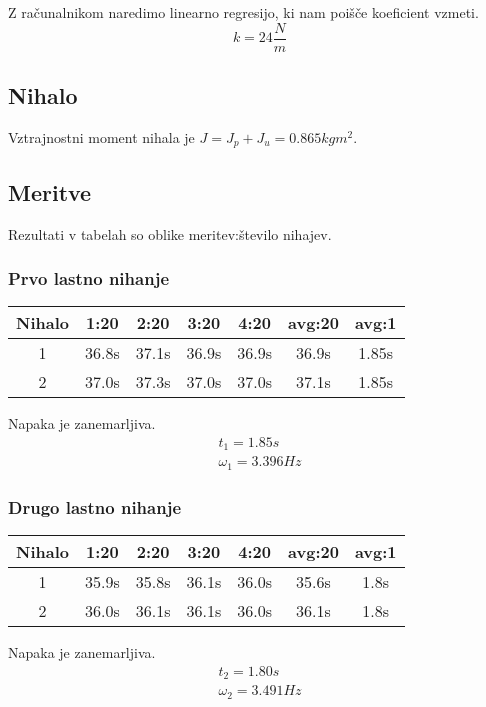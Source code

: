 \documentclass[a4paper]{article}
\begin{document}
Z računalnikom naredimo linearno regresijo, ki nam poišče koeficient vzmeti.
\[
  k=24\frac N m
\]
\subsection{Nihalo}
Vztrajnostni moment nihala je \(J = J_p+J_u = 0.865kgm^2\).
\subsection{Meritve}
Rezultati v tabelah so oblike meritev:število nihajev.
\subsubsection{Prvo lastno nihanje}
\begin{table}[htb]
  \centering
\begin{tabular}{*{7}{c}}
  Nihalo & 1:20 & 2:20 & 3:20 & 4:20 & avg:20 & avg:1\\\toprule
  1 & 36.8s & 37.1s & 36.9s & 36.9s & 36.9s & 1.85s\\\midrule
  2 & 37.0s & 37.3s & 37.0s & 37.0s & 37.1s & 1.85s\\\bottomrule
\end{tabular}
\end{table}
Napaka je zanemarljiva.
\begin{align*}
  t_1 = 1.85s\\
  \omega_1 = 3.396Hz
\end{align*}
\subsubsection{Drugo lastno nihanje}
\begin{table}[htb]
  \centering
\begin{tabular}{*{7}{c}}
  Nihalo & 1:20 & 2:20 & 3:20 & 4:20 & avg:20 & avg:1\\\toprule
  1 & 35.9s & 35.8s & 36.1s & 36.0s & 35.6s & 1.8s \\\midrule
  2 & 36.0s & 36.1s & 36.1s & 36.0s & 36.1s & 1.8s \\\bottomrule
\end{tabular}
\end{table}
Napaka je zanemarljiva.
\begin{align*}
  t_2 = 1.80s\\
  \omega_2 = 3.491Hz
\end{align*}
\end{document}
